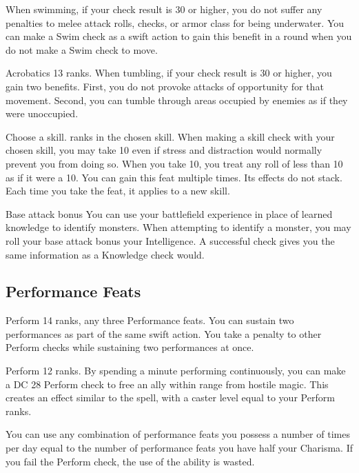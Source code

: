 When swimming, if your check result is 30 or higher, you do not suffer any penalties to melee attack rolls, checks, or armor class for being underwater. You can make a Swim check as a swift action to gain this benefit in a round when you do not make a Swim check to move.

\featpre Acrobatics 13 ranks.
\featben When tumbling, if your check result is 30 or higher, you gain two benefits. First, you do not provoke attacks of opportunity for that movement. Second, you can tumble through areas occupied by enemies as if they were unoccupied.

Choose a skill.
 ranks in the chosen skill.
\featben When making a skill check with your chosen skill, you may take 10 even if stress and distraction would normally prevent you from doing so. When you take 10, you treat any roll of less than 10 as if it were a 10.
 You can gain this feat multiple times. Its effects do not stack. Each time you take the feat, it applies to a new skill.

\featpre Base attack bonus 
\featben You can use your battlefield experience in place of learned knowledge to identify monsters. When attempting to identify a monster, you may roll your base attack bonus \add your Intelligence. A successful check gives you the same information as a Knowledge check would.

\subsection{Performance Feats}

\featpres Perform 14 ranks, any three Performance feats.
\featben You can sustain two performances as part of the same swift action. You take a  penalty to other Perform checks while sustaining two performances at once.

\featpre Perform 12 ranks.
\featben By spending a minute performing continuously, you can make a DC 28 Perform check to free an ally within \rngmed range from hostile magic. This creates an effect similar to the  spell, with a caster level equal to your Perform ranks.

You can use any combination of performance feats you possess a number of times per day equal to the number of performance feats you have \add half your Charisma. If you fail the Perform check, the use of the ability is wasted.

